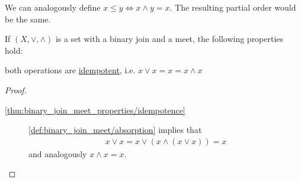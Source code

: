 \begin{note}\label{note:binary_join_meet_order}
  We can analogously define $x \leq y \iff x \land y = x$. The resulting partial order would be the same.
\end{note}

\begin{proposition}\label{thm:binary_join_meet_properties}
  If $(X, \lor, \land)$ is a set with a binary join and a meet, the following properties hold:
  \begin{defenum}
    \item\label{thm:binary_join_meet_properties/idempotence} both operations are \ul{idempotent}, i.e. $x \lor x = x = x \land x$
  \end{defenum}
\end{proposition}
\begin{proof}
  \begin{description}
    \item[\ref{thm:binary_join_meet_properties/idempotence}] \ref{def:binary_join_meet/absorption} implies that
    \begin{align*}
      x \lor x = x \lor (x \land (x \lor x)) = x
    \end{align*}
    and analogously $x \land x = x$.
  \end{description}
\end{proof}

